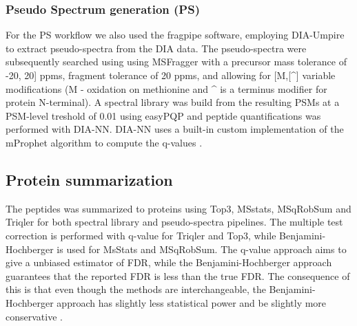 \documentclass[10pt,letterpaper]{article}
\begin{document}


\subsubsection*{Pseudo Spectrum generation (PS)}

 For the PS workflow we also used the fragpipe software, employing DIA-Umpire to extract pseudo-spectra from the DIA data. The pseudo-spectra were subsequently searched using using MSFragger with a precursor mass tolerance of -20, 20] ppms, fragment tolerance of 20 ppms, and allowing for [M,[\^{}] variable modifications (M - oxidation on methionine and \^{} is a terminus modifier for protein N-terminal). A spectral library was build from the resulting PSMs at a PSM-level treshold of 0.01 using easyPQP and peptide quantifications was performed with DIA-NN. DIA-NN uses a built-in custom implementation of the mProphet algorithm to compute the q-values \cite{reiter2011mprophet} \cite{demichev2020dia}.
 




\subsection*{Protein summarization}
The peptides was summarized to proteins using Top3, MSstats, MSqRobSum and Triqler for both spectral library and pseudo-spectra pipelines. The multiple test correction is performed with q-value for Triqler and Top3, while Benjamini-Hochberger \cite{benjamini1995controlling} is used for MsStats and MSqRobSum. The q-value approach aims to give a unbiased estimator of FDR, while the Benjamini-Hochberger approach guarantees that the reported FDR is less than the true FDR. The consequence of this is that even though the methods are interchangeable, the Benjamini-Hochberger approach has slightly less statistical power and be slightly more conservative \cite{korthauer2019practical}.
\end{document}
